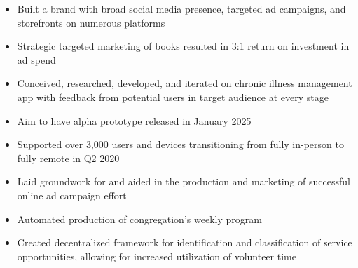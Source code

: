 \par\smallskip
\begin{minipage}{13.75cm}
  \begin{minipage}{6.5cm}
    \begin{itemize}
      \item Built a brand with broad social media presence, targeted
            ad campaigns, and storefronts on numerous platforms
      \item Strategic targeted marketing of books resulted in 3:1
            return on investment in ad spend
    \end{itemize}
  \end{minipage}
  \hfill
  \begin{minipage}{6.5cm}
    \begin{itemize}
      \item Conceived, researched, developed, and iterated on
            chronic illness management app with feedback from
            potential users in target audience at every stage
      \item Aim to have alpha prototype released in January 2025
    \end{itemize}
  \end{minipage}
\end{minipage}
\par\smallskip
\divider

\par\smallskip
\begin{minipage}{13.75cm}
  \begin{minipage}{6.5cm}
    \begin{itemize}
      \item Supported over 3,000 users and devices transitioning
            from fully in-person to fully remote in Q2 2020
      \item Laid groundwork for and aided in the production and
            marketing of successful online ad campaign effort
    \end{itemize}
  \end{minipage}
  \hfill
  \begin{minipage}{6.5cm}
    \begin{itemize}
      \item Automated production of congregation’s weekly program
      \item Created decentralized framework for identification and
            classification of service opportunities, allowing for
            increased utilization of volunteer time
    \end{itemize}
  \end{minipage}
\end{minipage}

